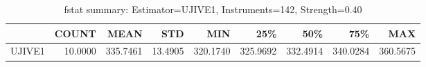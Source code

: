 \begin{table}[ht]
\centering
\caption{fstat summary: Estimator=UJIVE1, Instruments=142, Strength=0.40}
\begin{tabular}{lrrrrrrrr}
\toprule
 & COUNT & MEAN & STD & MIN & 25\% & 50\% & 75\% & MAX \\
\midrule
UJIVE1 & 10.0000 & 335.7461 & 13.4905 & 320.1740 & 325.9692 & 332.4914 & 340.0284 & 360.5675 \\
\bottomrule
\end{tabular}
\end{table}

